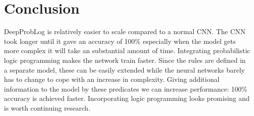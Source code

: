 \section{Conclusion}
DeepProbLog is relatively easier to scale compared to a normal CNN. The CNN took longer until it gave an accuracy of 100\% especially when the model gets more complex it will take an substantial amount of time. Integrating probabilistic logic programming makes the network train faster. Since the rules are defined in a separate model, these can be easily extended while the neural networks barely has to change to cope with an increase in complexity. Giving additional information to the model by these predicates we can increase performance: 100\% accuracy is achieved faster. Incorporating logic programming looks promising and is worth continuing research. 